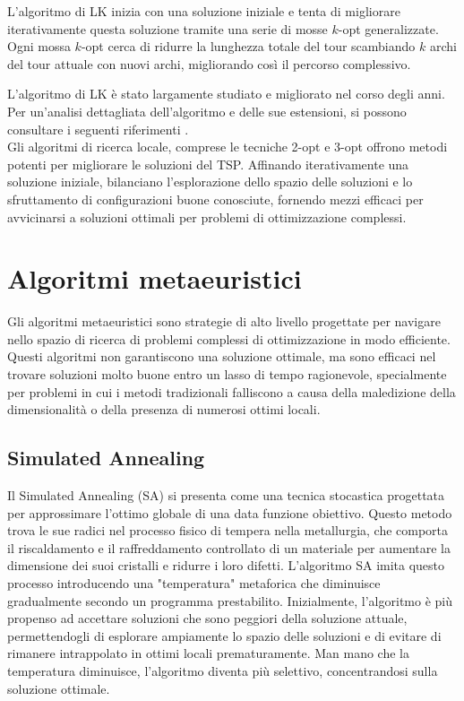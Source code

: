 L'algoritmo di \gls{LK} inizia con una soluzione iniziale e tenta di migliorare iterativamente questa soluzione tramite una serie di mosse \(k\)-opt generalizzate. Ogni mossa \(k\)-opt cerca di ridurre la lunghezza totale del tour scambiando \(k\) archi del tour attuale con nuovi archi, migliorando così il percorso complessivo.


L'algoritmo di \gls{LK} è stato largamente studiato e migliorato nel corso degli anni. Per un'analisi dettagliata dell'algoritmo e delle sue estensioni, si possono consultare i seguenti riferimenti \cite{Johnson2002,Lawler1985,Gutin2016}.
\\

Gli algoritmi di ricerca locale, comprese le tecniche 2-opt e 3-opt offrono metodi potenti per migliorare le soluzioni del \gls{TSP}. Affinando iterativamente una soluzione iniziale, bilanciano l'esplorazione dello spazio delle soluzioni e lo sfruttamento di configurazioni buone conosciute, fornendo mezzi efficaci per avvicinarsi a soluzioni ottimali per problemi di ottimizzazione complessi.


\section{Algoritmi metaeuristici}

Gli algoritmi metaeuristici sono strategie di alto livello progettate per navigare nello spazio di ricerca di problemi complessi di ottimizzazione in modo efficiente. Questi algoritmi non garantiscono una soluzione ottimale, ma sono efficaci nel trovare soluzioni molto buone entro un lasso di tempo ragionevole, specialmente per problemi in cui i metodi tradizionali falliscono a causa della maledizione della dimensionalità o della presenza di numerosi ottimi locali.

\subsection{Simulated Annealing}

Il Simulated Annealing (\gls{SA}) si presenta come una tecnica stocastica progettata per approssimare l'ottimo globale di una data funzione obiettivo. Questo metodo trova le sue radici nel processo fisico di tempera nella metallurgia, che comporta il riscaldamento e il raffreddamento controllato di un materiale per aumentare la dimensione dei suoi cristalli e ridurre i loro difetti. L'algoritmo SA imita questo processo introducendo una "temperatura" metaforica che diminuisce gradualmente secondo un programma prestabilito. Inizialmente, l'algoritmo è più propenso ad accettare soluzioni che sono peggiori della soluzione attuale, permettendogli di esplorare ampiamente lo spazio delle soluzioni e di evitare di rimanere intrappolato in ottimi locali prematuramente. Man mano che la temperatura diminuisce, l'algoritmo diventa più selettivo, concentrandosi sulla soluzione ottimale.

